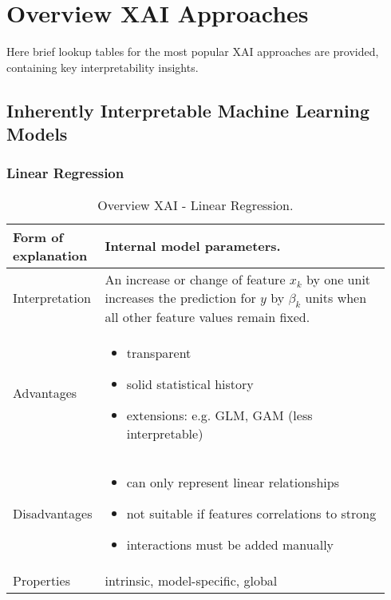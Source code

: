 
\appendix
\section{Overview XAI Approaches}\label{sec:7}

Here brief lookup tables for the most popular XAI approaches are provided, containing key interpretability insights.

\subsection{Inherently Interpretable Machine Learning Models}

\subsubsection{Linear Regression}
\begin{table}[H]
  \centering
  \begin{tabular}{|p{0.17\linewidth}|p{0.77\linewidth}|}
    \hline
    Form of \newline explanation & 
    Internal model parameters. \\
    
    \hline
    Interpretation & 
    An increase or change of feature  $x_k$  by one unit increases the prediction for $y$ by $\beta_k$  units when all other feature values remain fixed. \\
    \hline
    Advantages &
    \begin{itemize}[nosep, left=0em]
        \item transparent 
        \item solid statistical history
        \item extensions: e.g. GLM, GAM (less interpretable)
    \end{itemize} \\
    
    \hline
    Disadvantages &
    \begin{itemize}[nosep, left=0em]
        \item can only represent linear relationships 
        \item not suitable if features correlations to strong
        \item interactions must be added manually
    \end{itemize} \\
    
    \hline
    Properties & 
    intrinsic, model-specific, global  \\
    
    \hline
  \end{tabular}
  \caption{Overview XAI - Linear Regression.}
\end{table}


